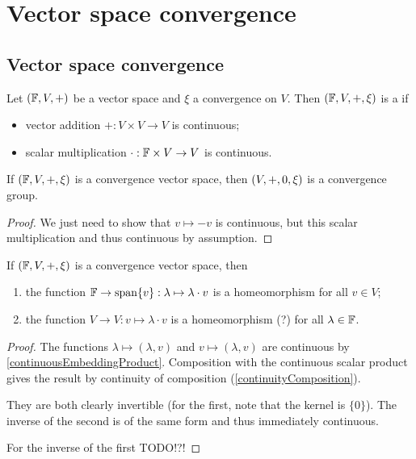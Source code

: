 \chapter{Vector space convergence}

\section{Vector space convergence}
\begin{definition}
Let $\left( \mathbb{F},V,+ \right)$ be a vector space and $\xi$ a convergence on $V$. Then $\left( \mathbb{F},V,+, \xi \right)$ is a  if
\begin{itemize}
\item vector addition $+: V\times V \to V$ is continuous;
\item scalar multiplication $\cdot: \mathbb{F}\times V \to V$ is continuous.
\end{itemize}
\end{definition}

\begin{lemma}
If $\left( \mathbb{F},V,+, \xi \right)$ is a convergence vector space, then $\left( V,+, 0, \xi \right)$ is a convergence group.
\end{lemma}
\begin{proof}
We just need to show that $v\mapsto -v$ is continuous, but this scalar multiplication and thus continuous by assumption.
\end{proof}

\begin{lemma} \label{continuityLemmaVectorConvergence}
If $\left( \mathbb{F},V,+, \xi \right)$ is a convergence vector space, then
\begin{enumerate}
\item the function $\mathbb{F} \to \operatorname{span}\{v\}: \lambda \mapsto \lambda\cdot v$ is a homeomorphism for all $v\in V$;
\item the function $V \to V: v \mapsto \lambda\cdot v$ is a homeomorphism (?) for all $\lambda\in \mathbb{F}$.
\end{enumerate}
\end{lemma}
\begin{proof}
The functions $\lambda \mapsto (\lambda, v)$ and $v \mapsto (\lambda, v)$ are continuous by \ref{continuousEmbeddingProduct}. Composition with the continuous scalar product gives the result by continuity of composition (\ref{continuityComposition}).

They are both clearly invertible (for the first, note that the kernel is $\{0\}$). The inverse of the second is of the same form and thus immediately continuous.

For the inverse of the first TODO!?!
\end{proof}

